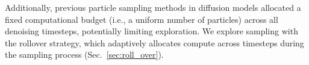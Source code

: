 Additionally, previous particle sampling methods in diffusion models allocated a fixed computational budget (i.e., a uniform number of particles) across all denoising timesteps, potentially limiting exploration.
We explore sampling with the rollover strategy, which adaptively allocates compute across timesteps during the sampling process (Sec.~\ref{sec:roll_over}). 







